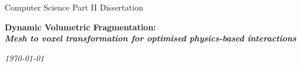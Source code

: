 \documentclass[a4 paper,twoside,openright,12pt]{book}
\begin{document}
\begin{titlepage}
\vspace{0pt}
\medskip
{}
\medskip
{}

\vfil
\centerline{\large Computer Science Part II Dissertation}
\vspace{0.4in}
\begin{center}
\Large\bf{Dynamic Volumetric Fragmentation:\\\emph{Mesh to voxel transformation for optimised physics-based interactions}}
\end{center}
\vspace{0.8in}
\centerline{\emph{\large{\today}}}
\vspace{1.2in}

\end{titlepage}
\end{document}
